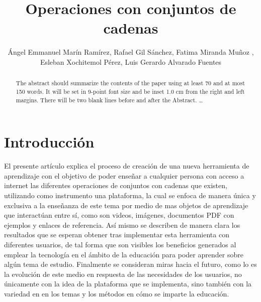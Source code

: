\documentclass{llncs}
\begin{document}
\title{Operaciones con conjuntos de cadenas}
%
%
\author{Ángel Emmanuel Marín Ramírez, Rafael Gil Sánchez, Fatima Miranda Muñoz , Esleban Xochitemol Pérez, Luis Gerardo Alvarado Fuentes
}
%
%


\maketitle              %

\begin{abstract}
The abstract should summarize the contents of the paper
using at least 70 and at most 150 words. It will be set in 9-point
font size and be inset 1.0 cm from the right and left margins.
There will be two blank lines before and after the Abstract. \dots

\end{abstract}
%
\section{Introducción}
%
El presente artículo explica el proceso de creación de una nueva herramienta de aprendizaje con el objetivo de poder enseñar a cualquier persona con acceso a internet las diferentes operaciones de conjuntos con cadenas que existen, utilizando como instrumento una plataforma, la cual se enfoca de manera única y exclusiva a la enseñanza de este tema por medio de mas objetos de aprendizaje que interactúan entre sí, como son videos, imágenes, documentos PDF con ejemplos y enlaces de referencia. Así mismo se describen de manera clara los resultados que se esperan obtener tras implementar esta herramienta con diferentes usuarios, de tal forma que son visibles los beneficios generados al emplear la tecnología en el ámbito de la educación  para poder aprender sobre algún tema de estudio.
Finalmente se consideran miras hacia el futuro, como lo es la evolución de este medio en respuesta de las necesidades de los usuarios, no únicamente con la idea de la plataforma que se implementa, sino también con la variedad en en los temas y los métodos en cómo se imparte la educación.
\end{document}

